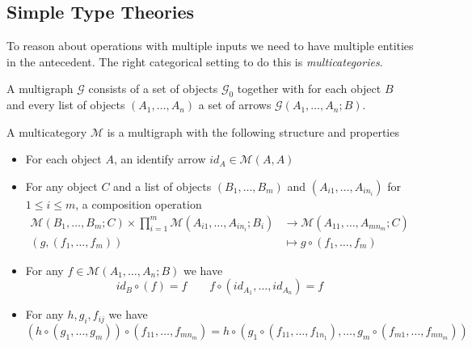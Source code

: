 \documentclass[acmsmall,screen, nonacm, anonymous]{acmart}
\begin{document}
\subsection{Simple Type Theories}
To reason about operations with multiple inputs we need to have multiple entities in the antecedent.
The right categorical setting to do this is \textit{multicategories}.

\begin{definition}

A multigraph $\mathcal{G}$ consists of a set of objects $\mathcal{G}_{0}$ together with for each object $B$ and every list of objects $(A_1,\ldots,A_n)$ a set of arrows $\mathcal{G}(A_1,\ldots,A_n;B)$.
\end{definition}

\begin{definition}
A multicategory $\mathcal{M}$ is a multigraph with the following structure and properties
\begin{itemize}
  \item For each object $A$, an identify arrow $id_{A} \in \mathcal{M}(A,A)$
  \item For any object $C$ and a list of objects $(B_1, \ldots, B_m)$ and $(A_{i1}, \ldots, A_{i n_{i}})$ for $1 \leq i \leq m$, a composition operation
  \begin{align*}
    \mathcal{M}(B_1, \ldots, B_m; C) \times \prod_{i=1}^{m}\mathcal{M}(A_{i1}, \ldots, A_{in_{i}};B_{i}) &\to \mathcal{M}(A_{11}, \ldots, A_{m n_{m}};C)\\
    (g, (f_1, \ldots, f_m)) &\mapsto g \circ (f_1, \ldots, f_m)
  \end{align*}
  \item For any $f \in \mathcal{M}(A_1, \ldots, A_n; B)$ we have
    \[
      id_{B} \circ (f) = f \qquad f \circ (id_{A_1}, \ldots, id_{A_n}) = f
    \] 
  \item For any $h, g_i, f_{ij}$ we have
    \[
      (h \circ (g_1, \ldots, g_m)) \circ (f_{11}, \ldots, f_{mn_m}) = h \circ (g_1 \circ (f_{11}, \ldots, f_{1 n_{1}}), \ldots, g_{m} \circ (f_{m 1}, \ldots, f_{m n_{m}}))
    \]
\end{itemize}
\end{definition}
\end{document}

